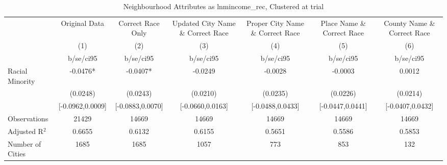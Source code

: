 \documentclass{article}
\begin{document}
\begin{table}[htbp]\centering
\def\sym#1{\ifmmode^{#1}\else\(^{#1}\)\fi}
\caption{Neighbourhood Attributes as lnmincome\_rec, Clustered at trial}
\begin{tabular}{l*{6}{c}}
\toprule
                    &\multicolumn{1}{c}{Original Data}&\multicolumn{1}{c}{Correct Race Only}&\multicolumn{1}{c}{Updated City Name \& Correct Race}&\multicolumn{1}{c}{Proper City Name \& Correct Race}&\multicolumn{1}{c}{Place Name \& Correct Race}&\multicolumn{1}{c}{County Name \& Correct Race}\\\cmidrule(lr){2-2}\cmidrule(lr){3-3}\cmidrule(lr){4-4}\cmidrule(lr){5-5}\cmidrule(lr){6-6}\cmidrule(lr){7-7}
                    &\multicolumn{1}{c}{(1)}   &\multicolumn{1}{c}{(2)}   &\multicolumn{1}{c}{(3)}   &\multicolumn{1}{c}{(4)}   &\multicolumn{1}{c}{(5)}   &\multicolumn{1}{c}{(6)}   \\
                    &   b/se/ci95   &   b/se/ci95   &   b/se/ci95   &   b/se/ci95   &   b/se/ci95   &   b/se/ci95   \\
\midrule
Racial Minority     &     -0.0476*  &     -0.0407*  &     -0.0249   &     -0.0028   &     -0.0003   &      0.0012   \\
                    &    (0.0248)   &    (0.0243)   &    (0.0210)   &    (0.0235)   &    (0.0226)   &    (0.0214)   \\
                    &[-0.0962,0.0009]   &[-0.0883,0.0070]   &[-0.0660,0.0163]   &[-0.0488,0.0433]   &[-0.0447,0.0441]   &[-0.0407,0.0432]   \\
\midrule
Observations        &       21429   &       14669   &       14669   &       14669   &       14669   &       14669   \\
Adjusted R$^2$      &      0.6655   &      0.6132   &      0.6155   &      0.5651   &      0.5586   &      0.5853   \\
Number of Cities    &        1685   &        1685   &        1057   &         773   &         853   &         132   \\
\bottomrule
\end{tabular}
\end{table}
\end{document}
